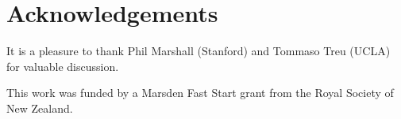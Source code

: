 \documentclass[useAMS,usenatbib]{mn2e}
\begin{document}
% 


%  
%  


\section*{Acknowledgements}
It is a pleasure to thank Phil Marshall (Stanford) and Tommaso Treu (UCLA)
for valuable discussion.

This work was funded by a Marsden Fast Start grant from the Royal Society of
New Zealand.
\end{document}

